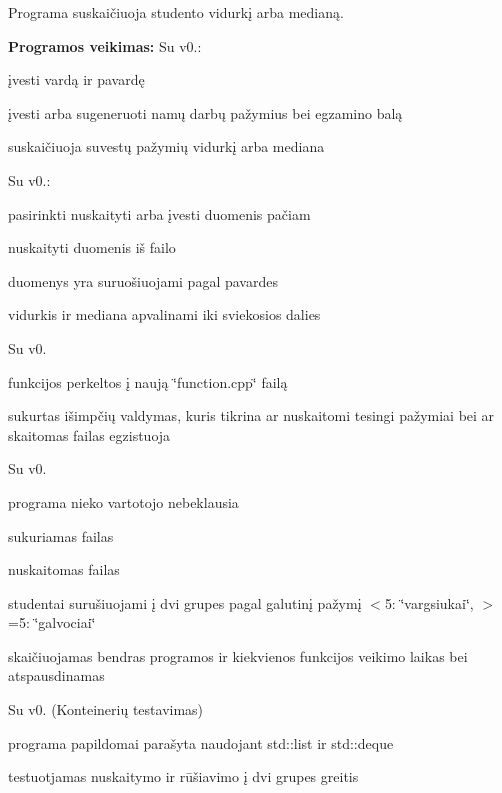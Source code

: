 Programa suskaičiuoja studento vidurkį arba medianą.

{\bfseries{Programos veikimas\+:}} Su v0.\+:
\begin{DoxyItemize}
\item įvesti vardą ir pavardę
\item įvesti arba sugeneruoti namų darbų pažymius bei egzamino balą
\item suskaičiuoja suvestų pažymių vidurkį arba mediana
\end{DoxyItemize}

Su v0.\+:
\begin{DoxyItemize}
\item pasirinkti nuskaityti arba įvesti duomenis pačiam
\item nuskaityti duomenis iš failo
\item duomenys yra suruošiuojami pagal pavardes
\item vidurkis ir mediana apvalinami iki sviekosios dalies
\end{DoxyItemize}

Su v0.
\begin{DoxyItemize}
\item funkcijos perkeltos į naują \char`\"{}function.\+cpp\char`\"{} failą
\item sukurtas išimpčių valdymas, kuris tikrina ar nuskaitomi tesingi pažymiai bei ar skaitomas failas egzistuoja
\end{DoxyItemize}

Su v0.
\begin{DoxyItemize}
\item programa nieko vartotojo nebeklausia
\item sukuriamas failas
\item nuskaitomas failas
\item studentai surušiuojami į dvi grupes pagal galutinį pažymį $<$5\+: \char`\"{}vargsiukai\char`\"{}, $>$=5\+: \char`\"{}galvociai\char`\"{}
\item skaičiuojamas bendras programos ir kiekvienos funkcijos veikimo laikas bei atspausdinamas
\end{DoxyItemize}

Su v0. (Konteinerių testavimas)
\begin{DoxyItemize}
\item programa papildomai parašyta naudojant std\+::list ir std\+::deque
\item testuotjamas nuskaitymo ir rūšiavimo į dvi grupes greitis
\end{DoxyItemize}


